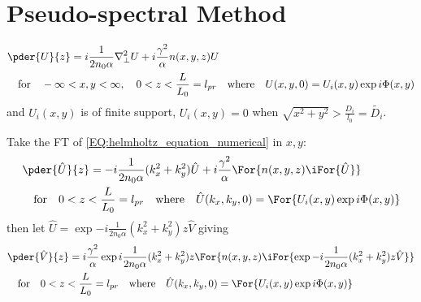 
\section{Pseudo-spectral Method}
\begin{equation}\label{EQ:helmholtz_equation_numerical}
\begin{split}
  & \pder{U}{z} =  i \frac{1}{2 n_0 \alpha}  \nabla_{\perp}^2 U + i \frac{\gamma^2}{ \alpha}  n(x,y,z) U  \\
  &\quad  \mbox{for}   
  \quad -\infty < x,y < \infty, \quad 0 < z < \frac{L}{L_0} = l_{pr} \quad  \mbox{where} \quad U(x,y,0) = U_{i}(x,y)\exp{i \Phi(x,y)}
\end{split}
\end{equation}
and $U_{i}(x,y)$ is of finite support, \ie $U_{i}(x,y) = 0$ when $\sqrt{x^2 + y^2} > \frac{D_{i}}{l_0} = \tilde{D_{i}}$.



Take the FT of \ref{EQ:helmholtz_equation_numerical} in $x,y$:
\begin{equation}
\begin{split}
  & \pder{\hat{U}}{z} =  -i \frac{1}{2 n_0 \alpha}  (k_x^2 + k_y^2) \hat{U} + i \frac{\gamma^2}{ \alpha}  \For{n(x,y,z) \iFor{\hat{U}} } \\
  &\quad  \mbox{for}  \quad 0 < z < \frac{L}{L_0} = l_{pr}
  \quad  \mbox{where} \quad \hat{U}(k_x,k_y,0) = \For{U_{i}(x,y)\exp{i \Phi(x,y)}}
\end{split}
\end{equation}
then let $\hat{U} = \exp{-i\frac{1}{2 n_0 \alpha}  (k_x^2 + k_y^2) z} \hat{V}$ giving
\begin{equation}
\begin{split}
  & \pder{\hat{V}}{z} =  i \frac{\gamma^2}{ \alpha}  \exp{i\frac{1}{2 n_0 \alpha}  (k_x^2 + k_y^2) z} 
  \For{n(x,y,z) \iFor{\exp{-i\frac{1}{2 n_0 \alpha}  (k_x^2 + k_y^2) z} \hat{V}} } \\
  &\quad  \mbox{for}  \quad 0 < z < \frac{L}{L_0} = l_{pr}
  \quad  \mbox{where} \quad \hat{U}(k_x,k_y,0) = \For{U_{i}(x,y)\exp{i \Phi(x,y)}}
\end{split}
\end{equation}

